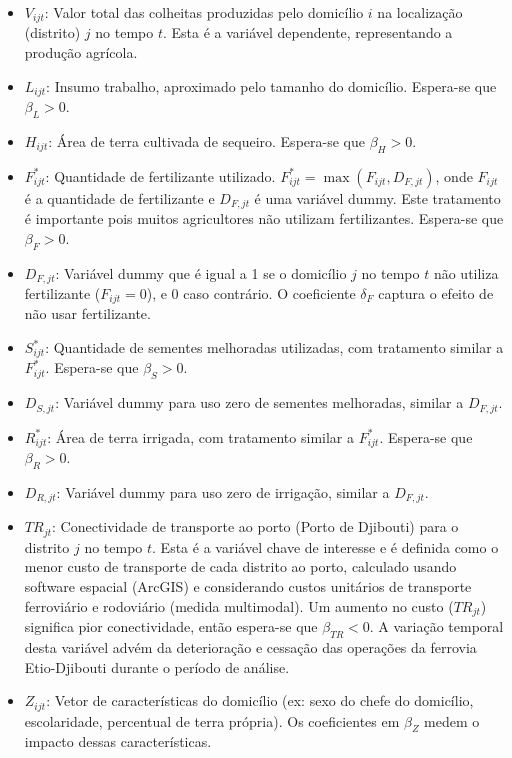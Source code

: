 \documentclass[12pt]{article}
\begin{document}
\begin{itemize}
    \item $V_{ijt}$: Valor total das colheitas produzidas pelo domicílio $i$ na localização (distrito) $j$ no tempo $t$. Esta é a variável dependente, representando a produção agrícola.
    \item $L_{ijt}$: Insumo trabalho, aproximado pelo tamanho do domicílio. Espera-se que $\beta_L > 0$.
    \item $H_{ijt}$: Área de terra cultivada de sequeiro. Espera-se que $\beta_H > 0$.
    \item $F_{ijt}^{*}$: Quantidade de fertilizante utilizado. $F_{ijt}^{*} = \max(F_{ijt}, D_{F,jt})$, onde $F_{ijt}$ é a quantidade de fertilizante e $D_{F,jt}$ é uma variável dummy. Este tratamento é importante pois muitos agricultores não utilizam fertilizantes. Espera-se que $\beta_F > 0$.
    \item $D_{F,jt}$: Variável dummy que é igual a 1 se o domicílio $j$ no tempo $t$ não utiliza fertilizante ($F_{ijt}=0$), e 0 caso contrário. O coeficiente $\delta_F$ captura o efeito de não usar fertilizante.
    \item $S_{ijt}^{*}$: Quantidade de sementes melhoradas utilizadas, com tratamento similar a $F_{ijt}^{*}$. Espera-se que $\beta_S > 0$.
    \item $D_{S,jt}$: Variável dummy para uso zero de sementes melhoradas, similar a $D_{F,jt}$.
    \item $R_{ijt}^{*}$: Área de terra irrigada, com tratamento similar a $F_{ijt}^{*}$. Espera-se que $\beta_R > 0$.
    \item $D_{R,jt}$: Variável dummy para uso zero de irrigação, similar a $D_{F,jt}$.
    \item $TR_{jt}$: Conectividade de transporte ao porto (Porto de Djibouti) para o distrito $j$ no tempo $t$. Esta é a variável chave de interesse e é definida como o menor custo de transporte de cada distrito ao porto, calculado usando software espacial (ArcGIS) e considerando custos unitários de transporte ferroviário e rodoviário (medida multimodal). Um aumento no custo ($TR_{jt}$) significa pior conectividade, então espera-se que $\beta_{TR} < 0$. A variação temporal desta variável advém da deterioração e cessação das operações da ferrovia Etio-Djibouti durante o período de análise.
    \item $Z_{ijt}$: Vetor de características do domicílio (ex: sexo do chefe do domicílio, escolaridade, percentual de terra própria). Os coeficientes em $\beta_Z$ medem o impacto dessas características.

\end{itemize}
\end{document}
